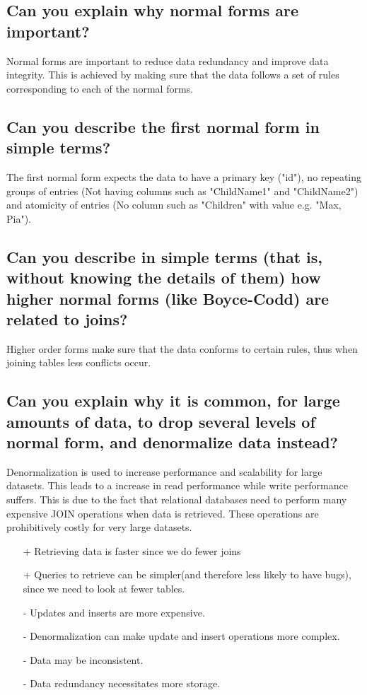 \documentclass{article}
\begin{document}
\subsection{Can you explain why normal forms are important?}

Normal forms are important to reduce data redundancy and improve data integrity. This is achieved by making sure that the data follows a set of rules corresponding to each of the normal forms.

\subsection{Can you describe the first normal form in simple terms?}

The first normal form expects the data to have a primary key ("id"), no repeating groups of entries (Not having columns such as "ChildName1" and "ChildName2") and atomicity of entries (No column such as "Children" with value e.g. "Max, Pia").

\subsection{Can you describe in simple terms (that is, without knowing the details of them) how higher normal forms (like Boyce-Codd) are related to joins?}

Higher order forms make sure that the data conforms to certain rules, thus when joining tables less conflicts occur.


\subsection{Can you explain why it is common, for large amounts of data, to drop several levels of normal form, and denormalize data instead?}

Denormalization is used to increase performance and scalability for large datasets. This leads to a increase in read performance while write performance suffers. This is due to the fact that relational databases need to perform many expensive JOIN operations when data is retrieved. These operations are prohibitively costly for very large datasets.

\begin{itemize}
    \item[+] Retrieving data is faster since we do fewer joins
    \item[+]Queries to retrieve can be simpler(and therefore less likely to have bugs), since we need to look at fewer tables.
    \item[-]Updates and inserts are more expensive.
    \item[-]Denormalization can make update and insert operations more complex.
    \item[-]Data may be inconsistent.
    \item[-]Data redundancy necessitates more storage.
\end{itemize}
\end{document}
